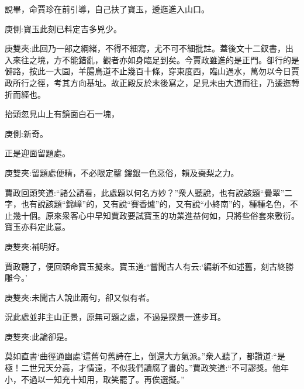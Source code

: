 \begin{parag}
    說畢，命賈珍在前引導，自己扶了寶玉，逶迤進入山口。\begin{note}庚側:寶玉此刻已料定吉多兇少。\end{note}\begin{note}庚雙夾:此回乃一部之綱緒，不得不細寫，尤不可不細批註。蓋後文十二釵書，出入來往之境，方不能錯亂，觀者亦如身臨足到矣。今賈政雖進的是正門。卻行的是僻路，按此一大園，羊腸鳥道不止幾百十條，穿東度西，臨山過水，萬勿以今日賈政所行之徑，考其方向基址。故正殿反於末後寫之，足見未由大道而往，乃逶迤轉折而經也。\end{note}抬頭忽見山上有鏡面白石一塊，\begin{note}庚側:新奇。\end{note}正是迎面留題處。\begin{note}庚雙夾:留題處便精，不必限定鑿 鏤銀一色惡俗，賴及棗梨之力。\end{note}賈政回頭笑道:“諸公請看，此處題以何名方妙？”衆人聽說，也有說該題“疊翠”二字，也有說該題“錦嶂”的，又有說“賽香爐”的，又有說“小終南”的，種種名色，不止幾十個。原來衆客心中早知賈政要試寶玉的功業進益何如，只將些俗套來敷衍。寶玉亦料定此意。\begin{note}庚雙夾:補明好。\end{note}賈政聽了，便回頭命寶玉擬來。寶玉道:“嘗聞古人有云:‘編新不如述舊，刻古終勝雕今。’\begin{note}庚雙夾:未聞古人說此兩句，卻又似有者。\end{note}況此處並非主山正景，原無可題之處，不過是探景一進步耳。\begin{note}庚雙夾:此論卻是。\end{note}莫如直書‘曲徑通幽處’這舊句舊詩在上，倒還大方氣派。”衆人聽了，都讚道:“是極！二世兄天分高，才情遠，不似我們讀腐了書的。”賈政笑道:“不可謬獎。他年小，不過以一知充十知用，取笑罷了。再俟選擬。”
\end{parag}


